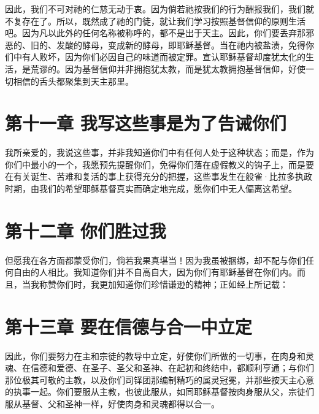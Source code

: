 因此，我们不可对祂的仁慈无动于衷。因为倘若祂按我们的行为酬报我们，我们就不复存在了。所以，既然成了祂的门徒，就让我们学习按照基督信仰的原则生活吧。因为凡以此外的任何名称被称呼的，都不是出于天主。因此，你们要丢弃那邪恶的、旧的、发酸的酵母，变成新的酵母，即耶稣基督。当在祂内被盐渍，免得你们中有人败坏，因为你们必因自己的味道而被定罪。宣认耶稣基督却度犹太化的生活，是荒谬的。因为基督信仰并非拥抱犹太教，而是犹太教拥抱基督信仰，好使一切相信的舌头都聚集到天主那里。\par


\section{第十一章 我写这些事是为了告诫你们}

我所亲爱的，我说这些事，并非我知道你们中有任何人处于这种状态；而是，作为你们中最小的一个，我愿预先提醒你们，免得你们落在虚假教义的钩子上，而是要在有关诞生、苦难和复活的事上获得充分的把握，这些事发生在般雀·比拉多执政时期，由我们的希望耶稣基督真实而确定地完成，愿你们中无人偏离这希望。\par


\section{第十二章 你们胜过我}

但愿我在各方面都蒙受你们，倘若我果真堪当！因为我虽被捆绑，却不配与你们任何自由的人相比。我知道你们并不自高自大，因为你们有耶稣基督在你们内。而且，当我称赞你们时，我更加知道你们珍惜谦逊的精神；正如经上所记载：\par


\section{第十三章 要在信德与合一中立定}

因此，你们要努力在主和宗徒的教导中立定，好使你们所做的一切事，在肉身和灵魂、在信德和爱德、在圣子、圣父和圣神、在起初和终结中，都顺利亨通；与你们那位极其可敬的主教，以及你们司铎团那编制精巧的属灵冠冕，并那些按天主心意的执事一起。你们要服从主教，也彼此服从，如同耶稣基督按肉身服从父，宗徒们服从基督、父和圣神一样，好使肉身和灵魂都得以合一。\par

